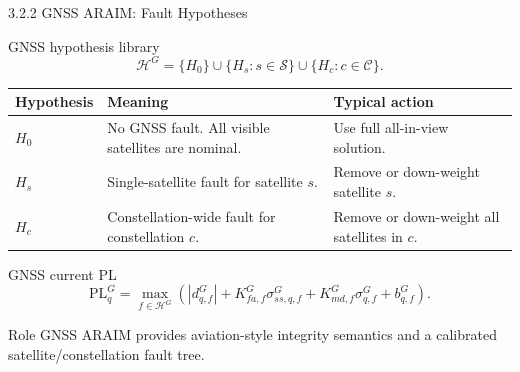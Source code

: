 \documentclass[10pt,aspectratio=169,xcolor=dvipsnames]{beamer}
\newcommand{\PL}{\mathrm{PL}}
\newcommand{\Hset}{\mathcal{H}}
\newcommand{\Sset}{\mathcal{S}}
\newcommand{\Cset}{\mathcal{C}}
\begin{document}
\begin{frame}{3.2.2 GNSS ARAIM: Fault Hypotheses}
  \small
  \begin{block}{GNSS hypothesis library}
    \vspace{-4pt}
    \[
      \Hset^G=\{H_0\}\cup\{H_s:s\in\Sset\}\cup\{H_c:c\in\Cset\}.
    \]
  \end{block}
    \vspace{-4mm}

  \begin{table}\scriptsize
    \begin{tabular}{p{} p{} p{}}
      \toprule
      \textbf{Hypothesis} & \textbf{Meaning} & \textbf{Typical action}\\
      \midrule
      $H_0$ & No GNSS fault. All visible satellites are nominal. & Use full all-in-view solution.\\
      $H_s$ & Single-satellite fault for satellite $s$. & Remove or down-weight satellite $s$.\\
      $H_c$ & Constellation-wide fault for constellation $c$. & Remove or down-weight all satellites in $c$.\\
      \bottomrule
    \end{tabular}
  \end{table}

  \begin{block}{GNSS current PL}
    \[
      \PL^G_q=\max_{f\in\Hset^G}
      \left(|d^G_{q,f}|+K^G_{fa,f}\sigma^G_{ss,q,f}+K^G_{md,f}\sigma^G_{q,f}+b^G_{q,f}\right).
    \]
  \end{block}

  \begin{exampleblock}{Role}
    \footnotesize GNSS ARAIM provides aviation-style integrity semantics and a calibrated satellite/constellation fault tree.
  \end{exampleblock}
\end{frame}
\end{document}
